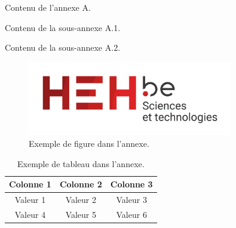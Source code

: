 Contenu de l'annexe A.

Contenu de la sous-annexe A.1.

Contenu de la sous-annexe A.2.
\begin{figure}[h!]
    \centering
    \includegraphics[width=0.8\textwidth]{img/logo_hehbe_tech.png}
    \caption{Exemple de figure dans l'annexe.}
    \label{fig:example_annexe}
\end{figure}

\begin{table}[h!]
    \centering
    \begin{tabular}{|c|c|c|}
        \hline
        Colonne 1 & Colonne 2 & Colonne 3 \\ \hline
        Valeur 1  & Valeur 2  & Valeur 3  \\ \hline
        Valeur 4  & Valeur 5  & Valeur 6  \\ \hline
    \end{tabular}
    \caption{Exemple de tableau dans l'annexe.}
    \label{tab:example_annexe}
\end{table}
